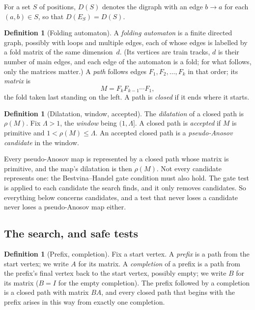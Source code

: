 \documentclass[11pt]{amsart}
\newcommand{\Lam}{\Lambda}
\newcommand{\D}{D}
\theoremstyle{plain}
\theoremstyle{definition}
\newtheorem{Definition}[Theorem]{Definition}
\begin{document}
For a set $S$ of positions, $\D(S)$ denotes the digraph with an edge
$b\to a$ for each $(a,b)\in S$, so that $\D(E_S)=\D(S)$.

\begin{Definition}[Folding automaton]
  \label{def:automaton}
  A \emph{folding automaton} is a finite directed graph, possibly with
  loops and multiple edges, each of whose edges is labelled by a fold
  matrix of the same dimension~$d$.  (Its vertices are train tracks, $d$ is
  their number of main edges, and each edge of the automaton is a fold; for
  what follows, only the matrices matter.)  A \emph{path} follows edges
  $F_1,F_2,\dots,F_k$ in that order; its \emph{matrix} is
  \[
    M=F_kF_{k-1}\cdots F_1,
  \]
  the fold taken last standing on the left.  A path is \emph{closed} if it
  ends where it starts.
\end{Definition}

\begin{Definition}[Dilatation, window, accepted]
  \label{def:accepted}
  The \emph{dilatation} of a closed path is $\rho(M)$.  Fix $\Lam>1$, the
  \emph{window} being $(1,\Lam]$.  A closed path is \emph{accepted} if $M$
  is primitive and $1<\rho(M)\le\Lam$.  An accepted closed path is a
  \emph{pseudo-Anosov candidate} in the window.
\end{Definition}

Every pseudo-Anosov map is represented by a closed path whose matrix is
primitive, and the map's dilatation is then $\rho(M)$.  Not every
candidate represents one: the Bestvina--Handel gate condition must also
hold.  The gate test is applied to each candidate the search finds, and
it only removes candidates.  So everything below concerns candidates, and
a test that never loses a candidate never loses a pseudo-Anosov map
either.

\subsection{The search, and safe tests}

\begin{Definition}[Prefix, completion]
  \label{def:prefix}
  Fix a start vertex.  A \emph{prefix} is a path from the start vertex; we
  write $A$ for its matrix.  A \emph{completion} of a prefix is a path from
  the prefix's final vertex back to the start vertex, possibly empty; we
  write $B$ for its matrix ($B=I$ for the empty completion).  The prefix
  followed by a completion is a closed path with matrix $BA$, and every
  closed path that begins with the prefix arises in this way from exactly
  one completion.
\end{Definition}
\end{document}

